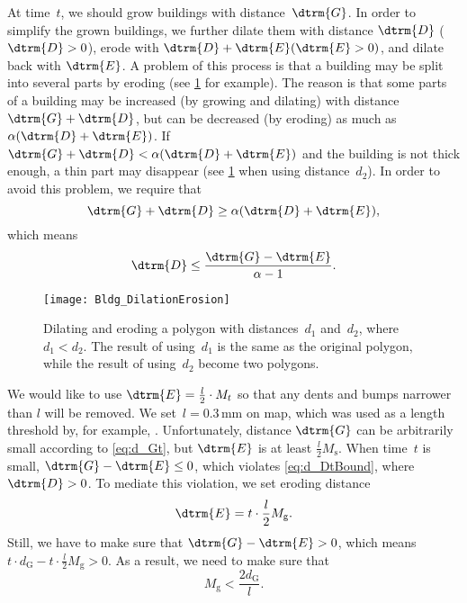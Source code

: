 At time~$t$, we should grow buildings with distance~$\dtrm{G}$.
In order to simplify the grown buildings, 
we further dilate them with distance $\dtrm{D}$ ($\dtrm{D}>0$),
erode with $\dtrm{D}+\dtrm{E} (\dtrm{E}>0)$,
and dilate back with $\dtrm{E}$.
A problem of this process is that 
a building may be split into several parts by eroding
(see \fig\ref{fig:ErosionBreak} for example).
The reason is that 
some parts of a building may be increased (by growing and 
dilating) 
with distance $\dtrm{G}+\dtrm{D}$, 
but can be decreased (by eroding) as much as $\alpha 
(\dtrm{D}+\dtrm{E})$.
If $\dtrm{G}+\dtrm{D} < \alpha (\dtrm{D}+\dtrm{E})$ 
and the building is not thick enough, 
a thin part may disappear
(see \fig\ref{fig:ErosionBreak} when using distance~$d_2$).
In order to avoid this problem, we require that
\[
\dtrm{G} + \dtrm{D} \ge \alpha (\dtrm{D}+\dtrm{E}),
\]
which means
\begin{equation}
\label{eq:d_DtBound}
\dtrm{D} \le \frac{\dtrm{G}-\dtrm{E}}{\alpha - 1}.
\end{equation}

\begin{figure}[tb]
	\centering
	\texttt{[image: Bldg\_DilationErosion]}
	\caption{Dilating and eroding a polygon 
		with distances~$d_1$ and~$d_2$, where $d_1 < d_2$.
		The result of using~$d_1$ 
		is the same as the original polygon,
		while the result of using~$d_2$
		become two polygons.
	}
	\label{fig:ErosionBreak}
\end{figure}

We would like to use $\dtrm{E}=\frac{l}{2} \cdot M_t$ so that
any dents and bumps narrower than $l$ will be removed. 
We set~$l=0.3\,\mathrm{mm}$ on map, 
which was used as a length threshold by, for example, 
\citet{Regnauld2001}.
Unfortunately, distance $\dtrm{G}$ can be arbitrarily small 
according to \eq\ref{eq:d_Gt}, 
but $\dtrm{E}$ is at least $\frac{l}{2} M_\mathrm{s}$. 
When time~$t$ is small, $\dtrm{G}-\dtrm{E} \le 0$, 
which violates \eq\ref{eq:d_DtBound}, where $\dtrm{D}>0$.
To mediate this violation, we set eroding distance
\begin{equation}
\label{eq:d_Et}
\dtrm{E} =t \cdot \frac{l}{2} M_\mathrm{g}.
\end{equation}
Still, we have to make sure that $\dtrm{G}-\dtrm{E} > 0$, which 
means
$t \cdot d_\mathrm{G} - t \cdot \frac{l}{2} M_\mathrm{g} >0$.
As a result, we need to make sure that
\begin{equation}
\label{eq:S_g}
M_\mathrm{g} < \frac{2 d_\mathrm{G}}{l}.
\end{equation}


